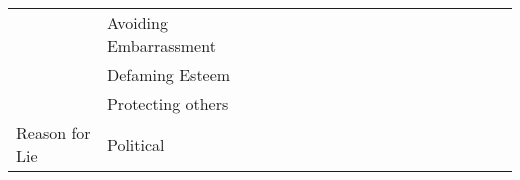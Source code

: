 \begin{table*}[!h]
{\begin{tabular}{l|l|l|l|l|l|l|l|l|l|l|l|l|l|l|l|l|l}
                                                        & Avoiding Embarrassment  & \multicolumn{1}{l|}{} & \multicolumn{1}{l|}{}                  & \multicolumn{1}{l|}{} & \multicolumn{1}{l|}{}                  & \multicolumn{1}{l|}{} & \multicolumn{1}{l|}{}                  & \multicolumn{1}{l|}{} &                   & \multicolumn{1}{l|}{} & \multicolumn{1}{l|}{}                  & \multicolumn{1}{l|}{} & \multicolumn{1}{l|}{}                  & \multicolumn{1}{l|}{} & \multicolumn{1}{l|}{}                  & \multicolumn{1}{l|}{} &                   \\ \cline{2-3} \cline{5-5} \cline{7-7} \cline{9-9} \cline{11-11} \cline{13-13} \cline{15-15} \cline{17-17}
                                                        & Defaming Esteem         & \multicolumn{1}{l|}{} & \multicolumn{1}{l|}{}                  & \multicolumn{1}{l|}{} & \multicolumn{1}{l|}{}                  & \multicolumn{1}{l|}{} & \multicolumn{1}{l|}{}                  & \multicolumn{1}{l|}{} &                   & \multicolumn{1}{l|}{} & \multicolumn{1}{l|}{}                  & \multicolumn{1}{l|}{} & \multicolumn{1}{l|}{}                  & \multicolumn{1}{l|}{} & \multicolumn{1}{l|}{}                  & \multicolumn{1}{l|}{} &                   \\ \cline{2-3} \cline{5-5} \cline{7-7} \cline{9-9} \cline{11-11} \cline{13-13} \cline{15-15} \cline{17-17}
                                                        & Protecting others       & \multicolumn{1}{l|}{} & \multicolumn{1}{l|}{}                  & \multicolumn{1}{l|}{} & \multicolumn{1}{l|}{}                  & \multicolumn{1}{l|}{} & \multicolumn{1}{l|}{}                  & \multicolumn{1}{l|}{} &                   & \multicolumn{1}{l|}{} & \multicolumn{1}{l|}{}                  & \multicolumn{1}{l|}{} & \multicolumn{1}{l|}{}                  & \multicolumn{1}{l|}{} & \multicolumn{1}{l|}{}                  & \multicolumn{1}{l|}{} &                   \\ \cline{1-18} 
                        \multirow{6}{*}{Reason for Lie} & Political               & \multicolumn{1}{l|}{} & \multicolumn{1}{l|}{\multirow{6}{*}{}} & \multicolumn{1}{l|}{} & \multicolumn{1}{l|}{\multirow{6}{*}{}} & \multicolumn{1}{l|}{} & \multicolumn{1}{l|}{\multirow{6}{*}{}} & \multicolumn{1}{l|}{} & \multirow{6}{*}{} & \multicolumn{1}{l|}{} & \multicolumn{1}{l|}{\multirow{6}{*}{}} & \multicolumn{1}{l|}{} & \multicolumn{1}{l|}{\multirow{6}{*}{}} & \multicolumn{1}{l|}{} & \multicolumn{1}{l|}{\multirow{6}{*}{}} & \multicolumn{1}{l|}{} & \multirow{6}{*}{} \\ \cline{2-3} \cline{5-5} \cline{7-7} \cline{9-9} \cline{11-11} \cline{13-13} \cline{15-15} \cline{17-17}

\end{tabular}}
\end{table*}
